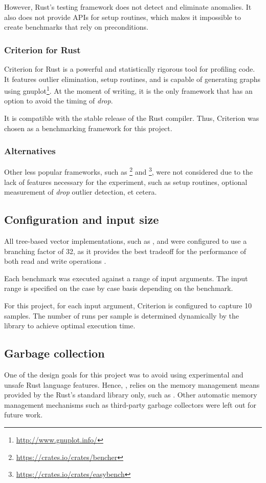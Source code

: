 However, Rust's testing framework does not detect and eliminate anomalies. It also does not provide APIs for setup routines, which makes it impossible to create benchmarks that rely on preconditions.

\subsubsection*{Criterion for Rust}
Criterion for Rust is a powerful and statistically rigorous tool for profiling code. It features outlier elimination, setup routines, and is capable of generating graphs using gnuplot\footnote{\url{http://www.gnuplot.info/}}. At the moment of writing, it is the only framework that has an option to avoid the timing of \emph{drop}.

It is compatible with the stable release of the Rust compiler. Thus, Criterion was chosen as a benchmarking framework for this project.

\subsubsection*{Alternatives}
Other less popular frameworks, such as \footnote{\url{https://crates.io/crates/bencher}} and \footnote{\url{https://crates.io/crates/easybench}}, were not considered due to the lack of features necessary for the experiment, such as setup routines, optional measurement of \emph{drop} outlier detection, et cetera.

\subsection{Configuration and input size}
All tree-based vector implementations, such as \rbvec{}, \rrbvec{} and \pvec{} were configured to use a branching factor of 32, as it provides the best tradeoff for the performance of both read and write operations \cite{efficient-immutable-vectors}.

Each benchmark was executed against a range of input arguments. The input range is specified on the case by case basis depending on the benchmark.

For this project, for each input argument, Criterion is configured to capture 10 samples. The number of runs per sample is determined dynamically by the library to achieve optimal execution time.

\subsection{Garbage collection}
One of the design goals for this project was to avoid using experimental and unsafe Rust language features. Hence, \pvecrs{}, relies on the memory management means provided by the Rust's standard library only, such as \rc{}. Other automatic memory management mechanisms such as third-party garbage collectors were left out for future work.

